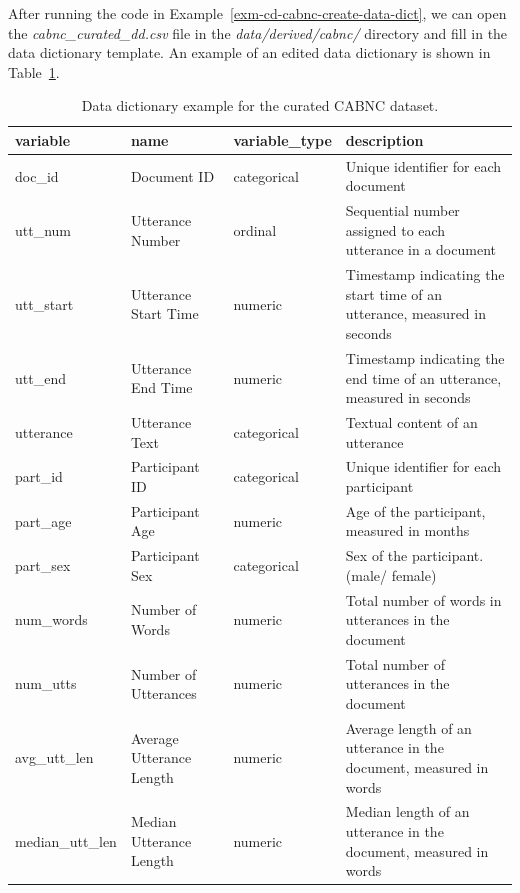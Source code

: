 \documentclass[
  letterpaper,
  DIV=11,
  numbers=noendperiod]{scrreport}
\theoremstyle{definition}
\theoremstyle{remark}
\begin{document}
After running the code in Example~\ref{exm-cd-cabnc-create-data-dict},
we can open the \emph{cabnc\_curated\_dd.csv} file in the
\emph{data/derived/cabnc/} directory and fill in the data dictionary
template. An example of an edited data dictionary is shown in
Table~\ref{tbl-cd-cabnc-dd-example}.

\hypertarget{tbl-cd-cabnc-dd-example}{}
\begin{table}
\caption{\label{tbl-cd-cabnc-dd-example}Data dictionary example for the curated CABNC dataset. }\tabularnewline

\centering
\begin{tabular}{l|l|l|l}
\hline
variable & name & variable\_type & description\\
\hline
doc\_id & Document ID & categorical & Unique identifier for each document\\
\hline
utt\_num & Utterance Number & ordinal & Sequential number assigned to each utterance in a document\\
\hline
utt\_start & Utterance Start Time & numeric & Timestamp indicating the start time of an utterance, measured in seconds\\
\hline
utt\_end & Utterance End Time & numeric & Timestamp indicating the end time of an utterance, measured in seconds\\
\hline
utterance & Utterance Text & categorical & Textual content of an utterance\\
\hline
part\_id & Participant ID & categorical & Unique identifier for each participant\\
\hline
part\_age & Participant Age & numeric & Age of the participant, measured in months\\
\hline
part\_sex & Participant Sex & categorical & Sex of the participant. (male/ female)\\
\hline
num\_words & Number of Words & numeric & Total number of words in utterances in the document\\
\hline
num\_utts & Number of Utterances & numeric & Total number of utterances in the document\\
\hline
avg\_utt\_len & Average Utterance Length & numeric & Average length of an utterance in the document, measured in words\\
\hline
median\_utt\_len & Median Utterance Length & numeric & Median length of an utterance in the document, measured in words\\
\hline
\end{tabular}
\end{table}
\end{document}
